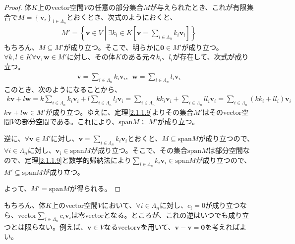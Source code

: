 \documentclass[dvipdfmx]{jsarticle}
\begin{document}
\begin{proof}
体$K$上のvector空間$V$の任意の部分集合$M$が与えられたとき、これが有限集合で$M = \left\{ \mathbf{v}_{i} \right\}_{i \in \varLambda_{n}}$とおくとき、次式のようにおくと、
\begin{align*}
M' = \left\{ \mathbf{v} \in V \middle| \exists k_{i} \in K\left\lbrack \mathbf{v} = \sum_{i \in \varLambda_{n}} {k_{i}\mathbf{v}_{i}} \right\rbrack \right\}
\end{align*}
もちろん、$M \subseteq M'$が成り立つ。そこで、明らかに$\mathbf{0} \in M'$が成り立つ。$\forall k,l \in K\forall\mathbf{v},\mathbf{w} \in M'$に対し、その体$K$のある元々$k_{i}$、$l_{i}$が存在して、次式が成り立つ。
\begin{align*}
\mathbf{v} = \sum_{i \in \varLambda_{n}} {k_{i}\mathbf{v}_{i}},\ \ \mathbf{w} = \sum_{i \in \varLambda_{n}} {l_{i}\mathbf{v}_{i}}
\end{align*}
このとき、次のようになることから、
\begin{align*}
k\mathbf{v} + l\mathbf{w} = k\sum_{i \in \varLambda_{n}} {k_{i}\mathbf{v}_{i}} + l\sum_{i \in \varLambda_{n}} {l_{i}\mathbf{v}_{i}} = \sum_{i \in \varLambda_{n}} {kk_{i}\mathbf{v}_{i}} + \sum_{i \in \varLambda_{n}} {ll_{i}\mathbf{v}_{i}} = \sum_{i \in \varLambda_{n}} {\left( kk_{i} + ll_{i} \right)\mathbf{v}_{i}}
\end{align*}
$k\mathbf{v} + l\mathbf{w} \in M'$が成り立つ。ゆえに、定理\ref{2.1.1.9}よりその集合$M'$はそのvector空間$V$の部分空間である。これにより、${\mathrm{span}}M \subseteq M'$が成り立つ。\par
逆に、$\forall\mathbf{v} \in M'$に対し、$\mathbf{v} = \sum_{i \in \varLambda_{n}} {k_{i}\mathbf{v}_{i}}$とおくと、$M \subseteq {\mathrm{span}}M$が成り立つので、$\forall i \in \varLambda_{n}$に対し、$\mathbf{v}_{i} \in {\mathrm{span}}M$が成り立つ。そこで、その集合${\mathrm{span}}M$は部分空間なので、定理\ref{2.1.1.9}と数学的帰納法により$\sum_{i \in \varLambda_{n}} {k_{i}\mathbf{v}_{i}} \in {\mathrm{span}}M$が成り立つので、$M' \subseteq {\mathrm{span}}M$が成り立つ。\par
よって、$M' = {\mathrm{span}}M$が得られる。
\end{proof}\par
もちろん、体$K$上のvector空間$V$において、$\forall i \in \varLambda_{n}$に対し、$c_{i} = 0$が成り立つなら、vector$\sum_{i \in \varLambda_{n}} {c_{i}\mathbf{v}_{i}}$は零vectorとなる。ところが、これの逆はいつでも成り立つとは限らない。例えば、$\mathbf{v} \in V$なるvector$\mathbf{v}$を用いて、$\mathbf{v} - \mathbf{v} = \mathbf{0}$を考えればよい。
\end{document}
